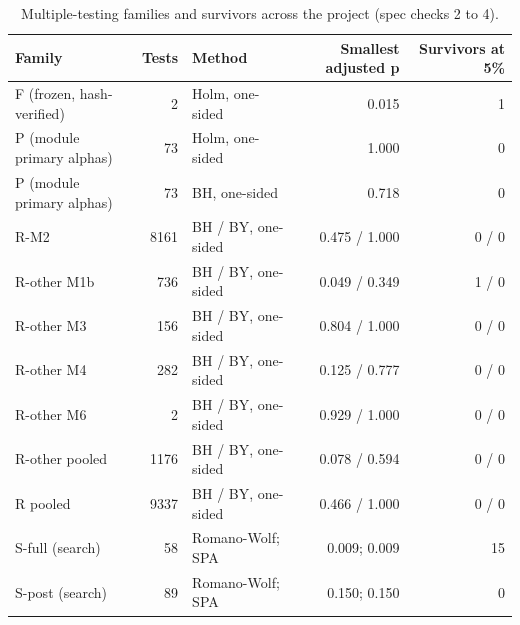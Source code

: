 \begin{table}[htbp]
\centering
\footnotesize
\caption{Multiple-testing families and survivors across the project (spec checks 2 to 4).}
\label{tab:m7_mt}
\begin{tabular}{lrlrr}
\toprule
Family & Tests & Method & Smallest adjusted p & Survivors at 5\% \\
\midrule
F (frozen, hash-verified) & 2 & Holm, one-sided & 0.015 & 1 \\
P (module primary alphas) & 73 & Holm, one-sided & 1.000 & 0 \\
P (module primary alphas) & 73 & BH, one-sided & 0.718 & 0 \\
R-M2 & 8161 & BH / BY, one-sided & 0.475 / 1.000 & 0 / 0 \\
R-other M1b & 736 & BH / BY, one-sided & 0.049 / 0.349 & 1 / 0 \\
R-other M3 & 156 & BH / BY, one-sided & 0.804 / 1.000 & 0 / 0 \\
R-other M4 & 282 & BH / BY, one-sided & 0.125 / 0.777 & 0 / 0 \\
R-other M6 & 2 & BH / BY, one-sided & 0.929 / 1.000 & 0 / 0 \\
R-other pooled & 1176 & BH / BY, one-sided & 0.078 / 0.594 & 0 / 0 \\
R pooled & 9337 & BH / BY, one-sided & 0.466 / 1.000 & 0 / 0 \\
S-full (search) & 58 & Romano-Wolf; SPA & 0.009; 0.009 & 15 \\
S-post (search) & 89 & Romano-Wolf; SPA & 0.150; 0.150 & 0 \\
\bottomrule
\end{tabular}
\par{}
\end{table}

